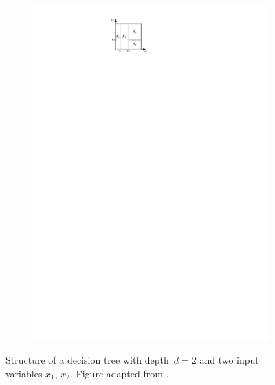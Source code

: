 \begin{figure}[htb]
\begin{subfigure}[t]{0.4\textwidth}
    \includegraphics{./figures/theory/decision_tree_partition.pdf}
    \label{fig:decision_tree_partition}
  \end{subfigure}
  \caption{Structure of a decision tree with depth~$d = 2$ and two input
    variables $x_1$, $x_2$. Figure adapted from \cite{esl}.}
  \label{fig:decision_tree}
\end{figure}

